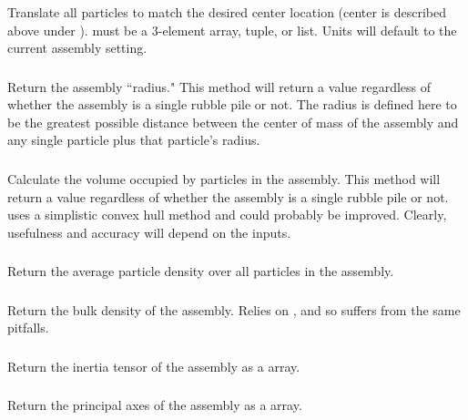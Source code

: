 \subsubsection{}
Translate all particles to match the desired center location (center is described above under ).  must be a 3-element  array, tuple, or list. Units will default to the current assembly setting.

\subsubsection{}
Return the assembly ``radius." This method will return a value regardless of whether the assembly is a single rubble pile or not. The radius is defined here to be the greatest possible distance between the center of mass of the assembly and any single particle plus that particle's radius.

\subsubsection{}
Calculate the volume occupied by particles in the assembly.  This method will return a value regardless of whether the assembly is a single rubble pile or not.  uses a simplistic convex hull method and could probably be improved. Clearly, usefulness and accuracy will depend on the inputs.


\subsubsection{}
Return the average particle density over all particles in the assembly.

\subsubsection{}
Return the bulk density of the assembly. Relies on , and so suffers from the same pitfalls.

\subsubsection{}
Return the inertia tensor of the assembly as a  array.

\subsubsection{}
Return the principal axes of the assembly as a  array.


